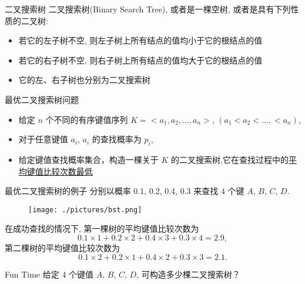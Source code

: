 \documentclass[fontset=fandol,UTF8,fleqn]{beamer}
\begin{document}
\begin{frame}{二叉搜索树}
二叉搜索树(Binary Search Tree), 或者是一棵空树,  或者是具有下列性质的二叉树:
\begin{itemize}
\item 若它的左子树不空, 则左子树上所有结点的值均小于它的根结点的值 
\item 若它的右子树不空, 则右子树上所有结点的值均大于它的根结点的值 
\item 它的左、右子树也分别为二叉搜索树 
\end{itemize}
\end{frame}

\begin{frame}{最优二叉搜索树问题}
\begin{itemize}
\item 给定 $n$ 个不同的有序键值序列 $ K =<a_1, a_2,\ldots, a_n>$, $(a_1 < a_2 <
  \ldots, < a_n)$,  
\item 对于任意键值 $a_i$,  $a_i$ 的查找概率为 $p_i$,　 
\item 给定键值查找概率集合，构造一棵关于 $K$ 的二叉搜索树,它在查找过程中的\underline{平均键值比较次数最低} 
\end{itemize}
\end{frame}

\begin{frame}{最优二叉搜索树的例子}
分别以概率 0.1, 0.2, 0.4, 0.3 来查找 4 个键 $A$, $B$, $C$, $D$. 
\begin{figure}
  \centering
  \texttt{[image: ./pictures/bst.png]}  
\end{figure}
\end{frame}

\begin{frame}{}
在成功查找的情况下, 第一棵树的平均键值比较次数为 
\begin{displaymath}
  0.1\times 1+ 0.2\times 2+0.4\times 3+0.3\times 4=2.9, 
\end{displaymath}
第二棵树的平均键值比较次数为 
\begin{displaymath}
  0.1\times 2+ 0.2\times 1+0.4\times 2+0.3\times 3=2.1. 
\end{displaymath}
\end{frame}

\begin{frame}{Fun Time}
给定 4 个键值 $A$, $B$, $C$, $D$, 可构造多少棵二叉搜索树？
\end{frame}
\end{document}
